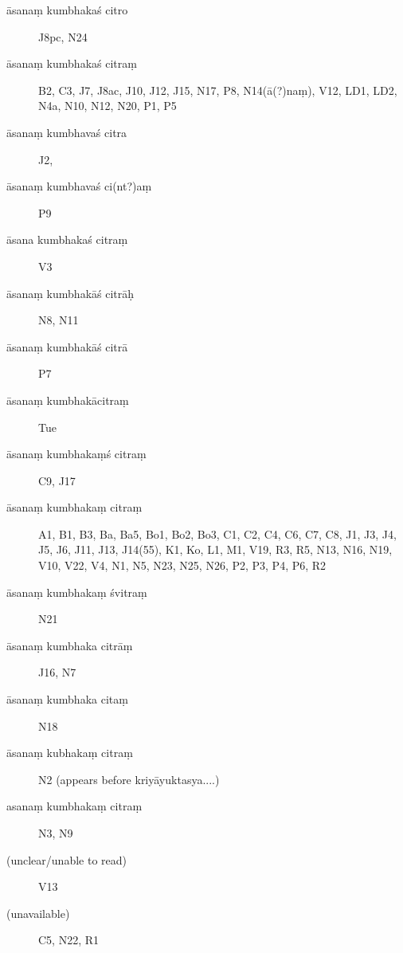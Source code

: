 \begin{ekdosis}
\begin{marma}[hp01_055]
    \begin{marma}[hp01_056]
      \begin{description}
      \item[āsanaṃ kumbhakaś citro] J8pc, N24
      \item[āsanaṃ kumbhakaś citraṃ] B2, C3, J7, J8ac, J10, J12, J15, N17, P8, N14(ā(?)naṃ), V12, LD1, LD2, N4a, N10, N12, N20, P1, P5
      \item[āsanaṃ kumbhavaś citra] J2,
      \item[āsanaṃ kumbhavaś ci(nt?)aṃ] P9
      \item[āsana kumbhakaś citraṃ] V3
      \item[āsanaṃ kumbhakāś citrāḥ]  N8, N11
      \item[āsanaṃ kumbhakāś citrā]   P7
      \item[āsanaṃ kumbhakācitraṃ]   Tue
      \item[āsanaṃ kumbhakaṃś citraṃ] C9, J17
      \item[āsanaṃ kumbhakaṃ citraṃ] A1, B1, B3, Ba, Ba5, Bo1, Bo2, Bo3, C1, C2, C4, C6, C7, C8, J1, J3, J4, J5, J6, J11, J13, J14(55), K1, Ko, L1, M1, V19, R3, R5, N13, N16, N19, V10, V22, V4, N1, N5, N23, N25, N26, P2, P3, P4, P6, R2
      \item[āsanaṃ kumbhakaṃ śvitraṃ]   N21   
      \item[āsanaṃ kumbhaka citrāṃ] J16, N7
      \item[āsanaṃ kumbhaka citaṃ] N18
      \item[āsanaṃ kubhakaṃ citraṃ] N2 (appears before kriyāyuktasya....)
      \item[asanaṃ kumbhakaṃ citraṃ] N3, N9
      \item[(unclear/unable to read)] V13
      \item[(unavailable)]        C5, N22, R1
      \end{description}


\end{marma}
\end{marma}
\end{ekdosis}
